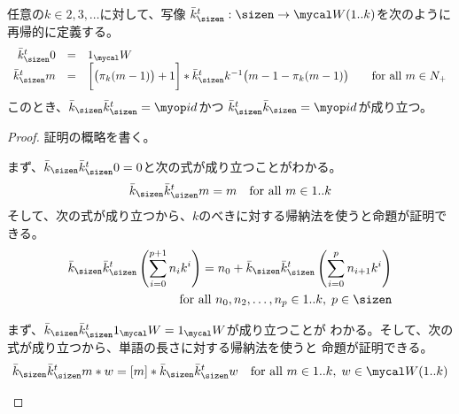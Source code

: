 	\begin{proposition}[双射的k進数表示のエンコード]
	\label{prop:双射的k進数表示のエンコード} %
		任意の$k\in2,3,\dots$に対して、写像
		$\bar{k}_\sizen^t:\sizen\to\Word(1..k)$を次のように再帰的に定義する。
		{\setlength\arraycolsep{1pt}
		\begin{equation*}\begin{array}{rcll}
			\bar{k}_\sizen^t 0 &=& 1_\Word \\
			\bar{k}_\sizen^t m &=& \biggl[\bigl(\pi_k(m-1)\bigr) + 1\biggr] 
			* \bar{k}_\sizen^tk^{-1}\bigl(m-1-\pi_k(m-1)\bigr)
			&\quad\text{for all } m\in N_+ \\
		\end{array}\end{equation*}
		}
		このとき、$\bar{k}_\sizen \bar{k}_\sizen^t=\id$かつ
		$\bar{k}_\sizen^t\bar{k}_\sizen=\id$が成り立つ。
	\end{proposition} %
	\begin{proof} 証明の概略を書く。
	\begin{description}\setlength{\itemsep}{-1mm} %
		\item[$\bar{k}_\sizen \bar{k}_\sizen^t=\id$について] 
		まず、$\bar{k}_\sizen\bar{k}_\sizen^t0=0$と次の式が成り立つことがわかる。
		\begin{equation*}\begin{split}
			\bar{k}_\sizen \bar{k}_\sizen^t m = m \quad\text{for all } m\in 1..k
		\end{split}\end{equation*}
		そして、次の式が成り立つから、$k$のべきに対する帰納法を使うと命題が証明できる。
		\begin{equation*}\begin{split}
			\bar{k}_\sizen \bar{k}_\sizen^t \left(\sum_{i=0}^{p+1}n_ik^i\right)
			= n_0 + \bar{k}_\sizen\bar{k}_\sizen^t
			\left(\sum_{i=0}^pn_{i+1}k^i\right) \\
			\quad\text{for all }n_0,n_2,\dots,n_p\in1..k,\;p\in\sizen
		\end{split}\end{equation*}
		\item[$\bar{k}_\sizen\bar{k}_\sizen^t=\id$について] 
		まず、$\bar{k}_\sizen\bar{k}_\sizen^t1_\Word=1_\Word$が成り立つことが
		わかる。そして、次の式が成り立つから、単語の長さに対する帰納法を使うと
		命題が証明できる。
		\begin{equation*}\begin{split}
			\bar{k}_\sizen\bar{k}_\sizen^t m*w
			= [m] * \bar{k}_\sizen\bar{k}_\sizen^t w
			\quad\text{for all }m\in1..k,\;w\in\Word(1..k)
		\end{split}\end{equation*}
	\end{description} %
	\end{proof}

